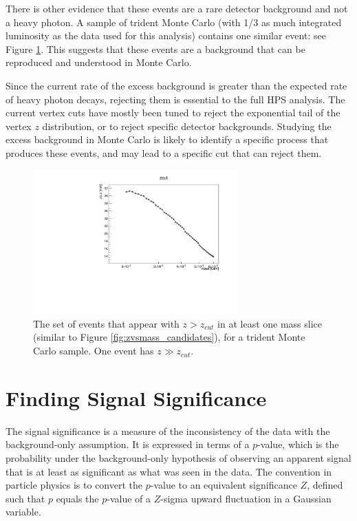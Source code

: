 There is other evidence that these events are a rare detector background and not a heavy photon.
A sample of trident Monte Carlo (with 1/3 as much integrated luminosity as the data used for this analysis) contains one similar event: see Figure \ref{fig:zvsmass_candidates_mc}.
This suggests that these events are a background that can be reproduced and understood in Monte Carlo.

Since the current rate of the excess background is greater than the expected rate of heavy photon decays, rejecting them is essential to the full HPS analysis.
The current vertex cuts have mostly been tuned to reject the exponential tail of the vertex $z$ distribution, or to reject specific detector backgrounds.
Studying the excess background in Monte Carlo is likely to identify a specific process that produces these events, and may lead to a specific cut that can reject them.

\begin{figure}[ht]
\begin{center}
    \includegraphics[width=0.7\textwidth,page=4,angle=-90]{vertexing/figs/mc_mres_output}
\end{center}
\caption{The set of events that appear with $z>z_{cut}$ in at least one mass slice (similar to Figure \ref{fig:zvsmass_candidates}), for a trident Monte Carlo sample.
One event has $z\gg z_{cut}$.
}
    \label{fig:zvsmass_candidates_mc}
\end{figure}

\clearpage
\section{Finding Signal Significance}
\label{sec:significance}
The signal significance is a measure of the inconsistency of the data with the background-only assumption.
It is expressed in terms of a $p$-value, which is the probability under the background-only hypothesis of observing an apparent signal that is at least as significant as what was seen in the data.
The convention in particle physics is to convert the $p$-value to an equivalent significance $Z$, defined such that $p$ equals the $p$-value of a $Z$-sigma upward fluctuation in a Gaussian variable.

